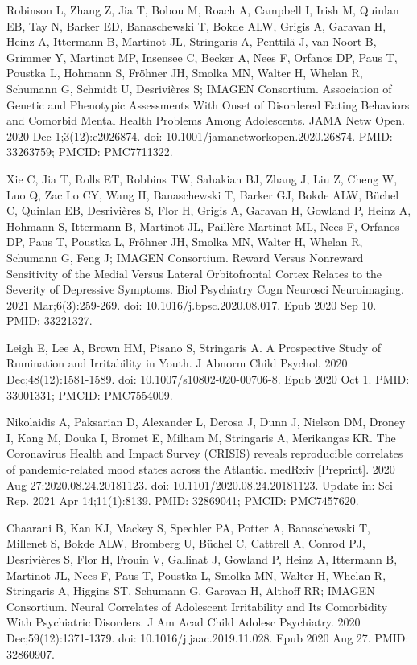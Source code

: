 \documentclass[
]{article}
\begin{document}
Robinson L, Zhang Z, Jia T, Bobou M, Roach A, Campbell I, Irish M,
Quinlan EB, Tay N, Barker ED, Banaschewski T, Bokde ALW, Grigis A,
Garavan H, Heinz A, Ittermann B, Martinot JL, Stringaris A, Penttilä J,
van Noort B, Grimmer Y, Martinot MP, Insensee C, Becker A, Nees F,
Orfanos DP, Paus T, Poustka L, Hohmann S, Fröhner JH, Smolka MN, Walter
H, Whelan R, Schumann G, Schmidt U, Desrivières S; IMAGEN Consortium.
Association of Genetic and Phenotypic Assessments With Onset of
Disordered Eating Behaviors and Comorbid Mental Health Problems Among
Adolescents. JAMA Netw Open. 2020 Dec 1;3(12):e2026874. doi:
10.1001/jamanetworkopen.2020.26874. PMID: 33263759; PMCID: PMC7711322.

Xie C, Jia T, Rolls ET, Robbins TW, Sahakian BJ, Zhang J, Liu Z, Cheng
W, Luo Q, Zac Lo CY, Wang H, Banaschewski T, Barker GJ, Bokde ALW,
Büchel C, Quinlan EB, Desrivières S, Flor H, Grigis A, Garavan H,
Gowland P, Heinz A, Hohmann S, Ittermann B, Martinot JL, Paillère
Martinot ML, Nees F, Orfanos DP, Paus T, Poustka L, Fröhner JH, Smolka
MN, Walter H, Whelan R, Schumann G, Feng J; IMAGEN Consortium. Reward
Versus Nonreward Sensitivity of the Medial Versus Lateral Orbitofrontal
Cortex Relates to the Severity of Depressive Symptoms. Biol Psychiatry
Cogn Neurosci Neuroimaging. 2021 Mar;6(3):259-269. doi:
10.1016/j.bpsc.2020.08.017. Epub 2020 Sep 10. PMID: 33221327.

Leigh E, Lee A, Brown HM, Pisano S, Stringaris A. A Prospective Study of
Rumination and Irritability in Youth. J Abnorm Child Psychol. 2020
Dec;48(12):1581-1589. doi: 10.1007/s10802-020-00706-8. Epub 2020 Oct 1.
PMID: 33001331; PMCID: PMC7554009.

Nikolaidis A, Paksarian D, Alexander L, Derosa J, Dunn J, Nielson DM,
Droney I, Kang M, Douka I, Bromet E, Milham M, Stringaris A, Merikangas
KR. The Coronavirus Health and Impact Survey (CRISIS) reveals
reproducible correlates of pandemic-related mood states across the
Atlantic. medRxiv {[}Preprint{]}. 2020 Aug 27:2020.08.24.20181123. doi:
10.1101/2020.08.24.20181123. Update in: Sci Rep. 2021 Apr 14;11(1):8139.
PMID: 32869041; PMCID: PMC7457620.

Chaarani B, Kan KJ, Mackey S, Spechler PA, Potter A, Banaschewski T,
Millenet S, Bokde ALW, Bromberg U, Büchel C, Cattrell A, Conrod PJ,
Desrivières S, Flor H, Frouin V, Gallinat J, Gowland P, Heinz A,
Ittermann B, Martinot JL, Nees F, Paus T, Poustka L, Smolka MN, Walter
H, Whelan R, Stringaris A, Higgins ST, Schumann G, Garavan H, Althoff
RR; IMAGEN Consortium. Neural Correlates of Adolescent Irritability and
Its Comorbidity With Psychiatric Disorders. J Am Acad Child Adolesc
Psychiatry. 2020 Dec;59(12):1371-1379. doi: 10.1016/j.jaac.2019.11.028.
Epub 2020 Aug 27. PMID: 32860907.
\end{document}
